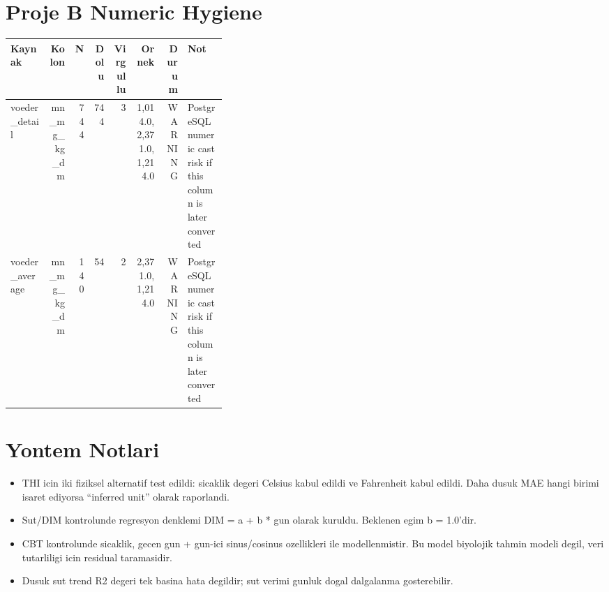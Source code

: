 \documentclass[11pt]{article}
\begin{document}
\section*{Proje B Numeric Hygiene}
\begin{longtable}{p{0.18\linewidth}rrrrrrp{0.18\linewidth}}
\toprule
Kaynak & Kolon & N & Dolu & Virgullu & Ornek & Durum & Not \\
\midrule
\endhead
voeder\_detail & mn\_mg\_kg\_dm & 744 & 744 & 3 & 1,014.0, 2,371.0, 1,214.0 & WARNING & PostgreSQL numeric cast risk if this column is later converted \\
voeder\_average & mn\_mg\_kg\_dm & 140 & 54 & 2 & 2,371.0, 1,214.0 & WARNING & PostgreSQL numeric cast risk if this column is later converted \\
\bottomrule
\end{longtable}

\section*{Yontem Notlari}
\begin{itemize}
\item THI icin iki fiziksel alternatif test edildi: sicaklik degeri Celsius kabul edildi ve Fahrenheit kabul edildi. Daha dusuk MAE hangi birimi isaret ediyorsa ``inferred unit'' olarak raporlandi.
\item Sut/DIM kontrolunde regresyon denklemi DIM = a + b * gun olarak kuruldu. Beklenen egim b = 1.0'dir.
\item CBT kontrolunde sicaklik, gecen gun + gun-ici sinus/cosinus ozellikleri ile modellenmistir. Bu model biyolojik tahmin modeli degil, veri tutarliligi icin residual taramasidir.
\item Dusuk sut trend R2 degeri tek basina hata degildir; sut verimi gunluk dogal dalgalanma gosterebilir.
\end{itemize}
\end{document}
